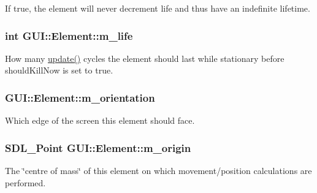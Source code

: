 If true, the element will never decrement life and thus have an indefinite lifetime. 

\hypertarget{classGUI_1_1Element_a432a31b103b55c3c8d14636368b449d1}{
\subsubsection[{m\-\_\-life}]{\setlength{\rightskip}{0pt plus 5cm}int G\-U\-I\-::\-Element\-::m\-\_\-life\hspace{0.3cm}{\ttfamily [protected]}}}\label{classGUI_1_1Element_a432a31b103b55c3c8d14636368b449d1}


How many \hyperlink{classGUI_1_1Element_ac33ecb92a9f9cb810bea83f31e4c14c9}{update()} cycles the element should last while stationary before should\-Kill\-Now is set to true. 

\hypertarget{classGUI_1_1Element_a7c189466d4d240eb13aa461887a70142}{
\subsubsection[{m\-\_\-orientation}]{ G\-U\-I\-::\-Element\-::m\-\_\-orientation\hspace{0.3cm}{\ttfamily [protected]}}}\label{classGUI_1_1Element_a7c189466d4d240eb13aa461887a70142}


Which edge of the screen this element should face. 

\hypertarget{classGUI_1_1Element_a7661fce6fff7da3d308cdb604f7a417a}{
\subsubsection[{m\-\_\-origin}]{\setlength{\rightskip}{0pt plus 5cm}S\-D\-L\-\_\-\-Point G\-U\-I\-::\-Element\-::m\-\_\-origin\hspace{0.3cm}{\ttfamily [protected]}}}\label{classGUI_1_1Element_a7661fce6fff7da3d308cdb604f7a417a}


The \char`\"{}centre of mass\char`\"{} of this element on which movement/position calculations are performed. 

